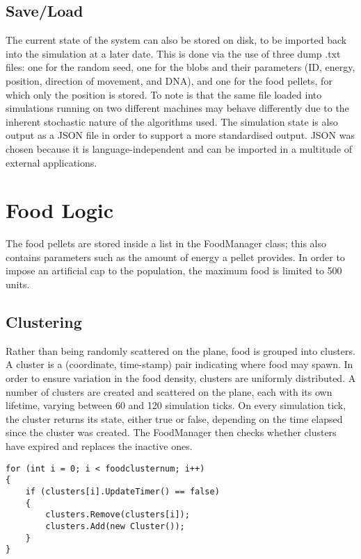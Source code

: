 \subsection{Save/Load}	
The current state of the system can also be stored on disk, to be imported back into the simulation at a later date. This is done via the use of three dump .txt files: one for the random seed, one for the blobs and their parameters (ID, energy, position, direction of movement, and DNA), and one for the food pellets, for which only the position is stored. To note is that the same file loaded into simulations running on two different machines may behave differently due to the inherent stochastic nature of the algorithms used.
The simulation state is also output as a JSON file in order to support a more standardised output. JSON was chosen because it is language-independent and can be imported in a multitude of external applications.

\section{Food Logic} \label{foodlogic}
The food pellets are stored inside a list in the FoodManager class; this also contains parameters such as the amount of energy a pellet provides. In order to impose an artificial cap to the population, the maximum food is limited to 500 units.

\subsection{Clustering}
Rather than being randomly scattered on the plane, food is grouped into clusters. A cluster is a (coordinate, time-stamp) pair indicating where food may spawn. In order to ensure variation in the food density, clusters are uniformly distributed. A number of clusters are created and scattered on the plane, each with its own lifetime, varying between 60 and 120 simulation ticks. On every simulation tick, the cluster returns its state, either true or false, depending on the time elapsed since the cluster was created. The FoodManager then checks whether clusters have expired and replaces the inactive ones.

\begin{lstlisting}
for (int i = 0; i < foodclusternum; i++)
{
    if (clusters[i].UpdateTimer() == false)
    {
        clusters.Remove(clusters[i]);
        clusters.Add(new Cluster());
    }
}
\end{lstlisting}

